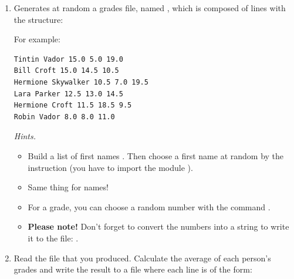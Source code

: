 \documentclass[11pt,class=report,crop=false]{standalone}
\begin{document}

\begin{activite}


\begin{enumerate}
  \item Generates at random a grades file, named , which is composed of lines with the structure: 
  
  For example:
\begin{center}
\begin{minipage}{0.5\textwidth}
\begin{lstlisting}
Tintin Vador 15.0 5.0 19.0
Bill Croft 15.0 14.5 10.5
Hermione Skywalker 10.5 7.0 19.5
Lara Parker 12.5 13.0 14.5
Hermione Croft 11.5 18.5 9.5
Robin Vador 8.0 8.0 11.0
\end{lstlisting}
\end{minipage}
\end{center}  
  

  \emph{Hints.}
  \begin{itemize}
    	\item Build a list of first names . Then choose a first name at random by the instruction  (you have to import the module ).
    	
    	\item Same thing for names! 
    	
    	\item For a grade, you can choose a random number with the command . 
    	
    	\item \textbf{Please note!} Don't forget to convert the numbers into a string to write it to the file: .
    	
   \end{itemize}
    
  
  \item Read the file  that you produced. Calculate the average of each person's grades and write the result to a file  where each line is of the form:   
 

\end{enumerate}
\end{activite}
\end{document}
